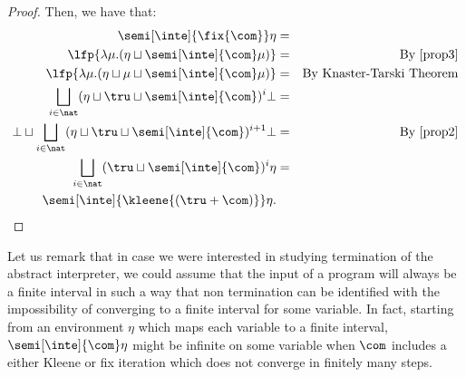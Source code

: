 \begin{proof}
  Then, we have that:
  \begin{align*}
    \semi[\inte]{\fix{\com}} \eta & = \\
    \lfp{\lambda \mu. (\eta \sqcup \semi[\inte]{\com} \mu)} & = &  \text{By \eqref{prop3}}\\
    \lfp{\lambda \mu. (\eta \sqcup \mu \sqcup \semi[\inte]{\com} \mu)} & = & \text{By Knaster-Tarski Theorem} \\
    \bigsqcup_{i \in \nat} (\eta \sqcup \tru \sqcup \semi[\inte]{\com})^i \bot & = \\
    \bot \sqcup \bigsqcup_{i \in \nat} (\eta \sqcup \tru \sqcup \semi[\inte]{\com})^{i+1} \bot & = & \text{By \eqref{prop2}}\\
    \bigsqcup_{i \in \nat} (\tru \sqcup \semi[\inte]{\com})^{i} \eta & = \\
    \semi[\inte]{\kleene{(\tru + \com)}} \eta. &
  \end{align*}  
\end{proof}

\begin{remark}
  Let us remark that in case we were interested in studying
  termination of the abstract interpreter, we could assume that the
  input of a program will always be a finite interval in such a way
  that non termination can be identified with the impossibility of
  converging to a finite interval for some variable. In fact, starting
  from an environment \(\eta\) which maps each variable to a finite
  interval, \(\semi[\inte]{\com}\eta\) might be infinite on some variable
  when \(\com\) includes a either Kleene or fix iteration which does
  not converge in finitely many steps.
\end{remark}
